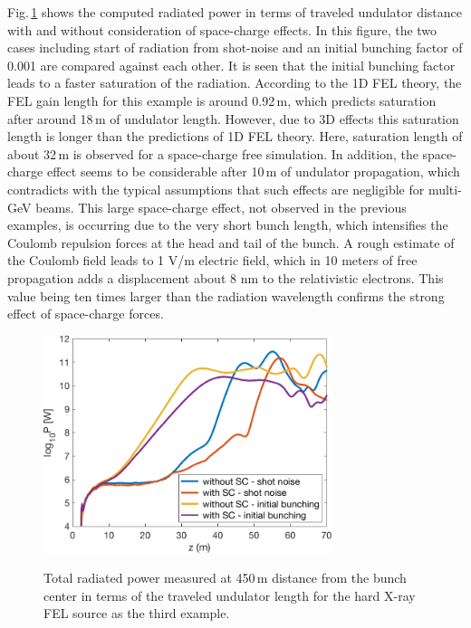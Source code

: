 Fig.\,\ref{power-example5} shows the computed radiated power in terms of traveled undulator distance with and without consideration of space-charge effects.
%
In this figure, the two cases including start of radiation from shot-noise and an initial bunching factor of 0.001 are compared against each other.
%
It is seen that the initial bunching factor leads to a faster saturation of the radiation.
%
According to the 1D FEL theory, the FEL gain length for this example is around 0.92\,m, which predicts saturation after around 18\,m of undulator length.
%
However, due to 3D effects this saturation length is longer than the predictions of 1D FEL theory.
%
Here, saturation length of about 32\,m is observed for a space-charge free simulation.
%
In addition, the space-charge effect seems to be considerable after 10\,m of undulator propagation, which contradicts with the typical assumptions that such effects are negligible for multi-GeV beams.
%
This large space-charge effect, not observed in the previous examples, is occurring due to the very short bunch length, which intensifies the Coulomb repulsion forces at the head and tail of the bunch.
%
A rough estimate of the Coulomb field leads to 1 V/m electric field, which in 10 meters of free propagation adds a displacement about 8 nm to the relativistic electrons.
%
This value being ten times larger than the radiation wavelength confirms the strong effect of space-charge forces.
%
\begin{figure}
	\centering
	\includegraphics[height=2.5in]{./MITHRA_EXAMPLES/Fig11/Fig11.pdf} \\
    \caption{Total radiated power measured at 450\,{\textmu}m distance from the bunch center in terms of the traveled undulator length for the hard X-ray FEL source as the third example.}
	\label{power-example5}
\end{figure}
